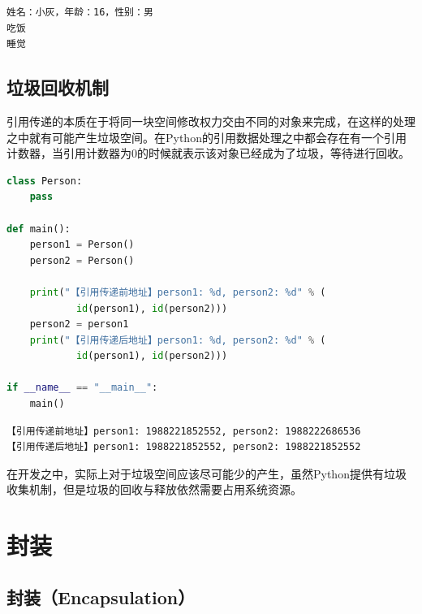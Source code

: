 \begin{tcolorbox}
	\begin{verbatim}
姓名：小灰，年龄：16，性别：男
吃饭
睡觉
\end{verbatim}
\end{tcolorbox}

\vspace{0.5cm}

\subsection{垃圾回收机制}

引用传递的本质在于将同一块空间修改权力交由不同的对象来完成，在这样的处理之中就有可能产生垃圾空间。在Python的引用数据处理之中都会存在有一个引用计数器，当引用计数器为0的时候就表示该对象已经成为了垃圾，等待进行回收。\\


\begin{lstlisting}[language=Python]
class Person:
    pass

def main():
    person1 = Person()
    person2 = Person()

    print("【引用传递前地址】person1: %d, person2: %d" % (
            id(person1), id(person2)))
    person2 = person1
    print("【引用传递后地址】person1: %d, person2: %d" % (
            id(person1), id(person2)))

if __name__ == "__main__":
    main()
\end{lstlisting}

\begin{tcolorbox}
	\begin{verbatim}
【引用传递前地址】person1: 1988221852552, person2: 1988222686536
【引用传递后地址】person1: 1988221852552, person2: 1988221852552
\end{verbatim}
\end{tcolorbox}

在开发之中，实际上对于垃圾空间应该尽可能少的产生，虽然Python提供有垃圾收集机制，但是垃圾的回收与释放依然需要占用系统资源。

\newpage

\section{封装}

\subsection{封装（Encapsulation）}

